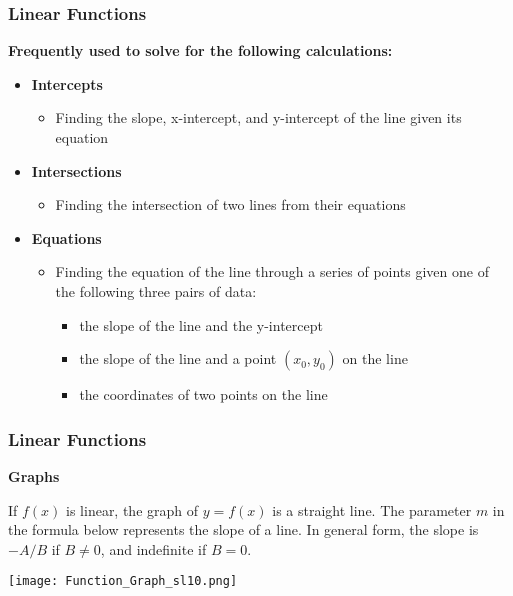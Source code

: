 \documentclass{beamer}
\begin{document}
\begin{frame}[fragile]\frametitle{Linear Functions}
\begin{center}\textbf{Frequently used to solve for the following calculations:} \end{center}

\vfill
\begin{itemize}
  \item \textbf{Intercepts}
  \begin{itemize}
    \item Finding the slope, x-intercept, and y-intercept of the line given its equation
  \end{itemize}
  \item \textbf{Intersections}
  \begin{itemize}
    \item Finding the intersection of two lines from their equations
  \end{itemize}
  \item \textbf{Equations}
  \begin{itemize}
       \item Finding the equation of the line through a series of points given one of the following three pairs of data:
       \begin{itemize}
        \item the slope of the line and the y-intercept
        \item the slope of the line and a point $(x_0,y_0)$ on the line
        \item the coordinates of two points on the line
       \end{itemize}
  \end{itemize}

\end{itemize}

\end{frame}

\begin{frame}[fragile]\frametitle{Linear Functions}
\begin{center}\textbf{Graphs} \end{center}

If $f(x)$ is linear, the graph of $y = f(x)$ is a straight line. The parameter $m$ in the formula below represents the slope of a line. In general form, the slope is $-A/B$ if $B \neq 0$, and indefinite if $B=0$.
\vspace{0.1in}

\begin{center}\texttt{[image: Function\_Graph\_sl10.png]} \end{center}

\end{frame}
\end{document}
